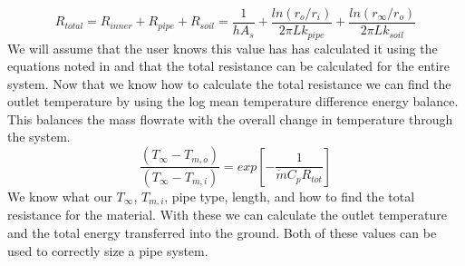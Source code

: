 %
\noindent
\begin{equation}
    { R }_{ total }={ R }_{ inner }+{ R }_{ pipe }+{ R }_{ soil }=\frac { 1 }{ h{ A }_{ s } } +\frac { ln({ { r }_{ o } }/{ { r }_{ i } }) }{ { 2\pi Lk }_{ pipe } } +\frac { ln({ { r }_{ \infty  } }/{ { r }_{ o } }) }{ { 2\pi Lk }_{ soil } } 
\end{equation}
%
We will assume that the user knows this value has has calculated it using the equations noted in \cite{farouki1981thermal} and that the total resistance can be calculated for the entire system. Now that we know how to calculate the total resistance we can find the outlet temperature by using the log mean temperature difference energy balance. This balances the mass flowrate with the overall change in temperature through the system.
%
\begin{equation}
    \frac { ({ T }_{ \infty  }-{ T }_{ m,o }) }{ ({ T }_{ \infty  }-{ T }_{ m,i }) } =exp\left[ -\frac { 1 }{ \dot { m } { C }_{ p }{ R }_{ tot } }  \right] 
\end{equation}
%
We know what our ${ T }_{ \infty }$, ${ T }_{ m,i }$, pipe type, length, and how to find the total resistance for the material. With these we can calculate the outlet temperature and the total energy transferred into the ground. Both of these values can be used to correctly size a pipe system.
